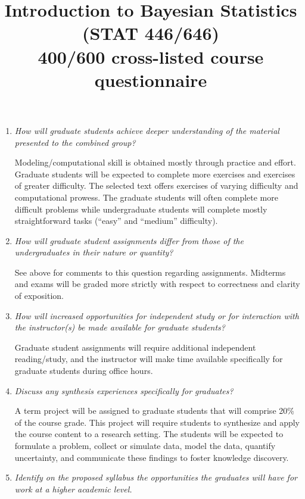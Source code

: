 \documentclass[11pt,onecolumn]{article}
\title{Introduction to Bayesian Statistics (STAT 446/646) \\ 400/600 cross-listed course questionnaire}
\begin{document}
\date{}
\maketitle

\vspace{-0.75in}

\begin{enumerate}
\item \emph{How will graduate students achieve deeper understanding of the material presented to the combined group?}

  Modeling/computational skill is obtained mostly through practice and effort. Graduate students will be expected to complete more exercises and exercises of greater difficulty. The selected text offers exercises of varying difficulty and computational prowess. The graduate students will often complete more difficult problems while undergraduate students will complete mostly straightforward tasks (``easy'' and ``medium'' difficulty).
  
\item \emph{How will graduate student assignments differ from those of the undergraduates in their nature or quantity?}

  See above for comments to this question regarding assignments. Midterms and exams will be graded more strictly with respect to correctness and clarity of exposition.

\item \emph{How will increased opportunities for independent study or for interaction with the instructor(s) be made available for graduate students?}

  Graduate student assignments will require additional independent reading/study, and the instructor will make time available specifically for graduate students during office hours.
  
\item \emph{Discuss any synthesis experiences specifically for graduates?}

  A term project will be assigned to graduate students that will comprise 20\% of the course grade. This project will require students to synthesize and apply the course content to a research setting. The students will be expected to formulate a problem, collect or simulate data, model the data, quantify uncertainty, and communicate these findings to foster knowledge discovery.

\item \emph{Identify on the proposed syllabus the opportunities the graduates will have for work at a higher academic level.}


\end{enumerate}
\end{document}
